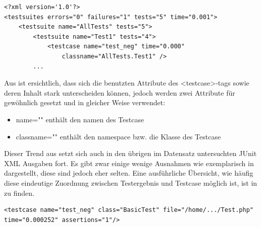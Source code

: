 \begin{lstlisting}[caption={JUnit XML, erzeugt durch das Haskell-Testframework tasty mit dem ant-Plugin.\\ \textellipsis{} bezeichnet gekürzte Stellen.}, label={JUNITtasty}]
<?xml version='1.0'?>
<testsuites errors="0" failures="1" tests="5" time="0.001">
    <testsuite name="AllTests" tests="5">
        <testsuite name="Test1" tests="4">
            <testcase name="test_neg" time="0.000"
                classname="AllTests.Test1" />
        ...
\end{lstlisting}

Aus  ist ersichtlich, dass sich die benutzten Attribute des <testcase>-tags sowie deren Inhalt stark unterscheiden können, jedoch werden zwei Attribute für gewöhnlich gesetzt und in gleicher Weise verwendet:
\begin{itemize}
    \item name="" enthält den namen des Testcase
    \item classname="" enthält den namespace bzw. die Klasse des Testcase
\end{itemize}
Dieser Trend aus  setzt sich auch in den übrigen im Datensatz untersuchten JUnit XML Ausgaben fort. Es gibt zwar einige wenige Ausnahmen wie exemplarisch in  dargestellt, diese sind jedoch eher selten. Eine ausführliche Übersicht, wie häufig diese eindeutige Zuordnung zwischen Testergebnis und Testcase möglich ist, ist in  zu finden.\\

\begin{lstlisting}[caption={JUnit XML für den Testcase test\_neg, erzeugt durch das PHP-Testframework codeception. Codeception benutzt statt dem häufig verwendetem Attribut "classname" das Attribut "class".\\ \textellipsis{} bezeichnet gekürzte Stellen.}, label={JUNITcodeception}]
<testcase name="test_neg" class="BasicTest" file="/home/.../Test.php" time="0.000252" assertions="1"/>
\end{lstlisting}



